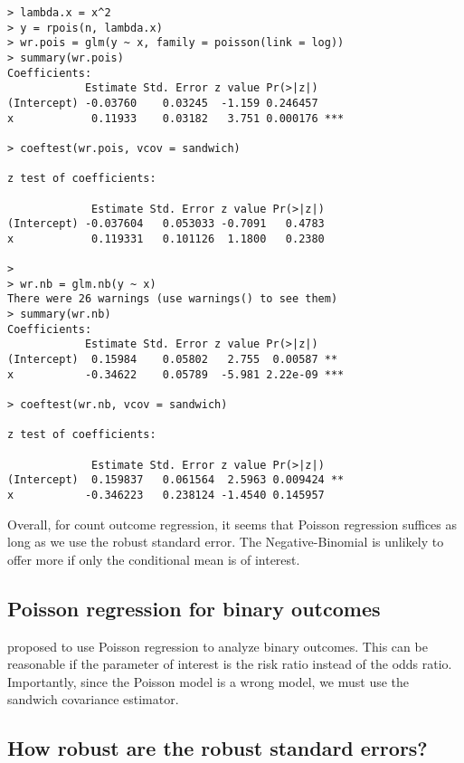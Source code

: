 \begin{lstlisting}
> lambda.x = x^2
> y = rpois(n, lambda.x)
> wr.pois = glm(y ~ x, family = poisson(link = log))
> summary(wr.pois)
Coefficients:
            Estimate Std. Error z value Pr(>|z|)    
(Intercept) -0.03760    0.03245  -1.159 0.246457    
x            0.11933    0.03182   3.751 0.000176 ***

> coeftest(wr.pois, vcov = sandwich)

z test of coefficients:

             Estimate Std. Error z value Pr(>|z|)
(Intercept) -0.037604   0.053033 -0.7091   0.4783
x            0.119331   0.101126  1.1800   0.2380

> 
> wr.nb = glm.nb(y ~ x)
There were 26 warnings (use warnings() to see them)
> summary(wr.nb)
Coefficients:
            Estimate Std. Error z value Pr(>|z|)    
(Intercept)  0.15984    0.05802   2.755  0.00587 ** 
x           -0.34622    0.05789  -5.981 2.22e-09 ***

> coeftest(wr.nb, vcov = sandwich)

z test of coefficients:

             Estimate Std. Error z value Pr(>|z|)   
(Intercept)  0.159837   0.061564  2.5963 0.009424 **
x           -0.346223   0.238124 -1.4540 0.145957   
\end{lstlisting}


Overall, for count outcome regression, it seems that Poisson regression suffices as long as we use the robust standard error. The Negative-Binomial is unlikely to offer more if only the conditional mean is of interest. 




\subsection{Poisson regression for binary outcomes}


\citet{zou2004modified} proposed to use Poisson regression to analyze binary outcomes. This can be reasonable if the parameter of interest is the risk ratio instead of the odds ratio. Importantly, since the Poisson model is a wrong model, we must use the sandwich covariance estimator. 

 


\subsection{How robust are the robust standard errors?}


